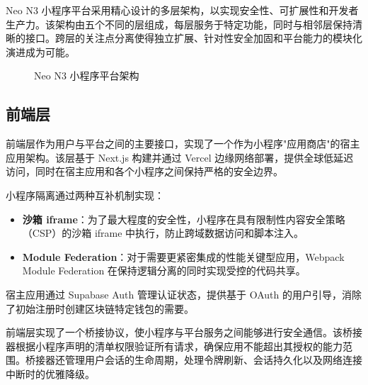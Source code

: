 \documentclass[11pt,a4paper]{article}
\begin{document}
Neo N3 小程序平台采用精心设计的多层架构，以实现安全性、可扩展性和开发者生产力。该架构由五个不同的层组成，每层服务于特定功能，同时与相邻层保持清晰的接口。跨层的关注点分离使得独立扩展、针对性安全加固和平台能力的模块化演进成为可能。

\begin{figure}[h]
\centering
{}
\caption{Neo N3 小程序平台架构}
\end{figure}

\subsection{前端层}

前端层作为用户与平台之间的主要接口，实现了一个作为小程序"应用商店"的宿主应用架构。该层基于 Next.js 构建并通过 Vercel 边缘网络部署，提供全球低延迟访问，同时在宿主应用和各个小程序之间保持严格的安全边界。

小程序隔离通过两种互补机制实现：

\begin{itemize}
    \item \textbf{沙箱 iframe}：为了最大程度的安全性，小程序在具有限制性内容安全策略（CSP）的沙箱 iframe 中执行，防止跨域数据访问和脚本注入。
    \item \textbf{Module Federation}：对于需要更紧密集成的性能关键型应用，Webpack Module Federation 在保持逻辑分离的同时实现受控的代码共享。
\end{itemize}

宿主应用通过 Supabase Auth 管理认证状态，提供基于 OAuth 的用户引导，消除了初始注册时创建区块链特定钱包的需要。

前端层实现了一个桥接协议，使小程序与平台服务之间能够进行安全通信。该桥接器根据小程序声明的清单权限验证所有请求，确保应用不能超出其授权的能力范围。桥接器还管理用户会话的生命周期，处理令牌刷新、会话持久化以及网络连接中断时的优雅降级。
\end{document}
